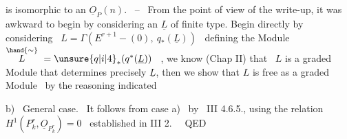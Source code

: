 
is isomorphic to an $\underline{O}_P(n)$. \ -- \ From the point of view of the write-up, it was
awkward to begin by considering an $\underline{L}$ of finite type. Begin directly
by considering \ $L = \Gamma(E^{r+1}-(0),\ q_*(\underline{L}))$ \ defining the Module
$\overset{\hand{\sim}}{L} \ = \unsure{q|i|4}_*(q^*(\underline{L}))$ \ , we know (Chap II) that \ $L$ is a graded Module that
determines precisely $\underline{L}$, then we show that $L$ is free as a graded
Module \ by the reasoning indicated

b) \ General case. \ It follows from case a) \ by \ III 4.6.5., using
the relation \ $H^1(P^r_k,\underline{O}_{P^r_k}) = 0$ \ established in III 2. \ \ QED

